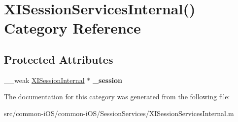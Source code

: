 \hypertarget{category_x_i_session_services_internal_07_08}{}\section{X\+I\+Session\+Services\+Internal() Category Reference}
\label{category_x_i_session_services_internal_07_08}
\subsection*{Protected Attributes}
\begin{DoxyCompactItemize}
\item 
\hypertarget{category_x_i_session_services_internal_07_08_ab396c66b4143e9f79e242be31a128000}{}\label{category_x_i_session_services_internal_07_08_ab396c66b4143e9f79e242be31a128000} 
\+\_\+\+\_\+weak \hyperlink{interface_x_i_session_internal}{X\+I\+Session\+Internal} $\ast$ {\bfseries \+\_\+session}
\end{DoxyCompactItemize}


The documentation for this category was generated from the following file\+:\begin{DoxyCompactItemize}
\item 
src/common-\/i\+O\+S/common-\/i\+O\+S/\+Session\+Services/X\+I\+Session\+Services\+Internal.\+m\end{DoxyCompactItemize}
